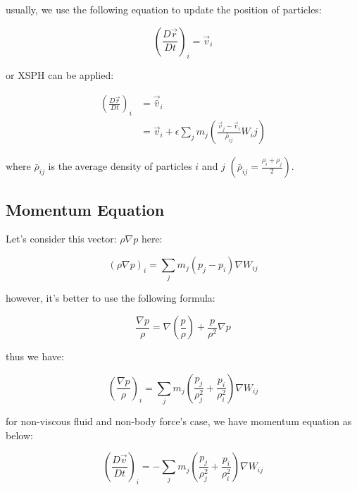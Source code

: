 \documentclass[10pt, oneside]{article}
\begin{document}
usually, we use the following equation to update the position of particles:

\begin{equation}
    \left(\frac{D\vec{r}}{Dt}\right)_i = \vec{v}_i
\end{equation}

or XSPH can be applied:

\begin{equation}
    \begin{aligned}
        \left(\frac{D\vec{r}}{Dt}\right)_i &= \vec{\hat{v}}_i
        \\
        &=\vec{v}_i + \epsilon \sum_j m_j \left(
            \frac{\vec{v}_{j}-\vec{v}_{i}}{\bar{\rho}_{ij}}W_ij
        \right)
    \end{aligned}
\end{equation}

where $\bar{\rho}_{ij}$ is the average density of particles $i$ and $j$ $(\bar{\rho}_{ij}=\frac{\rho_i+\rho_j}{2})$.

\subsection{Momentum Equation}

Let's consider this vector: $\rho\nabla p$ here:

\begin{equation}
    (\rho\nabla p)_i = \sum_j
    m_j(p_j-p_i)\nabla W_{ij}
\end{equation}

however, it's better to use the following formula:

\begin{equation}
    \frac{\nabla p}{\rho} = \nabla\left(\frac{p}{\rho}\right) + 
    \frac{p}{\rho^2}\nabla p
\end{equation}

thus we have:

\begin{equation}
    \left(
        \frac{\nabla p}{\rho}
    \right)_i = \sum_j
    m_j\left(
        \frac{p_j}{\rho_j^2}+\frac{p_i}{\rho_i^2}
    \right)\nabla W_{ij}
\end{equation}


for non-viscous fluid and non-body force's case, we have momentum equation as below:

\begin{equation}
    \left(\frac{D \vec{v}}{Dt}\right)_i = -\sum_j
    m_j\left(
        \frac{p_j}{\rho_j^2}+\frac{p_i}{\rho_i^2}
    \right)\nabla W_{ij}
\end{equation}
\end{document}
